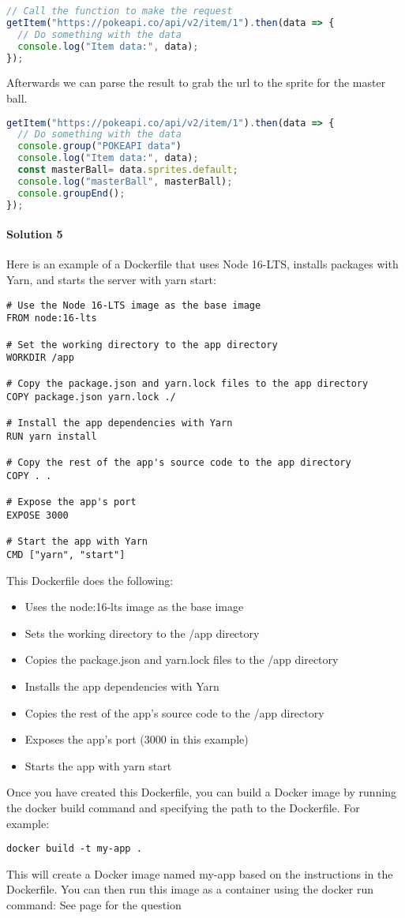 {\begin{lstlisting}[language=Javascript, caption=Fetch data from Pokeapi]
// Call the function to make the request
getItem("https://pokeapi.co/api/v2/item/1").then(data => {
  // Do something with the data
  console.log("Item data:", data);
});
\end{lstlisting}

Afterwards we can parse the result to grab the url to the sprite for the master ball.

\begin{lstlisting}[language=Javascript, caption="parsing result from pokeapi]
getItem("https://pokeapi.co/api/v2/item/1").then(data => {
  // Do something with the data
  console.group("POKEAPI data")
  console.log("Item data:", data);
  const masterBall= data.sprites.default;
  console.log("masterBall", masterBall);
  console.groupEnd();
});
\end{lstlisting}


\paragraph{Solution 5}

Here is an example of a Dockerfile that uses Node 16-LTS, installs packages with Yarn, and starts the server with yarn start:
\begin{lstlisting}[language=docker]
# Use the Node 16-LTS image as the base image
FROM node:16-lts

# Set the working directory to the app directory
WORKDIR /app

# Copy the package.json and yarn.lock files to the app directory
COPY package.json yarn.lock ./

# Install the app dependencies with Yarn
RUN yarn install

# Copy the rest of the app's source code to the app directory
COPY . .

# Expose the app's port
EXPOSE 3000

# Start the app with Yarn
CMD ["yarn", "start"]
\end{lstlisting}

This Dockerfile does the following:
\begin{itemize}
\item Uses the node:16-lts image as the base image
\item  Sets the working directory to the /app directory
\item  Copies the package.json and yarn.lock files to the /app directory
\item Installs the app dependencies with Yarn
\item Copies the rest of the app's source code to the /app directory
\item Exposes the app's port (3000 in this example)
\item  Starts the app with yarn start
\end{itemize}
Once you have created this Dockerfile, you can build a Docker image by running the docker build command and specifying the path to the Dockerfile. For example:

\begin{verbatim}
docker build -t my-app .
\end{verbatim}

This will create a Docker image named my-app based on the instructions in the Dockerfile. You can then run this image as a container using the docker run command:
See page \pageref{ex:5} for the question
 }
 

 \cleanalldata
